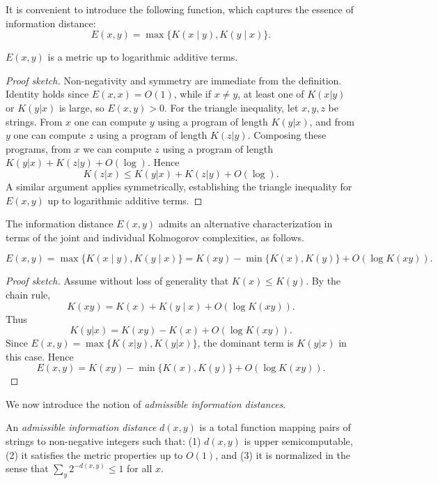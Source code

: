 It is convenient to introduce the following function, which captures the essence of information distance:
\[
E(x, y) = \max\{ K(x \mid y), K(y \mid x) \}.
\]
\begin{proposition}
$E(x,y)$ is a metric up to logarithmic additive terms.
\end{proposition}
\begin{proof}[Proof sketch]
Non-negativity and symmetry are immediate from the definition. 
Identity holds since $E(x,x) = O(1)$, while if $x \neq y$, at least one of $K(x|y)$ or $K(y|x)$ is large, so $E(x,y) > 0$. 
For the triangle inequality, let $x,y,z$ be strings. 
From $x$ one can compute $y$ using a program of length $K(y|x)$, and from $y$ one can compute $z$ using a program of length $K(z|y)$. 
Composing these programs, from $x$ we can compute $z$ using a program of length $K(y|x)+K(z|y)+O(\log)$. 
Hence
\[
K(z|x) \leq K(y|x) + K(z|y) + O(\log).
\]
A similar argument applies symmetrically, establishing the triangle inequality for $E(x,y)$ up to logarithmic additive terms.
\end{proof}

The information distance $E(x,y)$ admits an alternative characterization in terms of the joint and individual Kolmogorov complexities, as follows.

\begin{proposition}
\[
E(x, y) = \max\{ K(x \mid y), K(y \mid x) \} = K(xy) - \min\{ K(x), K(y) \} + O(\log K(xy)).
\]
\end{proposition}
\begin{proof}[Proof sketch]
Assume without loss of generality that $K(x) \leq K(y)$. 
By the chain rule,
\[
K(xy) = K(x) + K(y \mid x) + O(\log K(xy)).
\]
Thus
\[
K(y|x) = K(xy) - K(x) + O(\log K(xy)).
\]
Since $E(x,y) = \max\{K(x|y),K(y|x)\}$, the dominant term is $K(y|x)$ in this case. 
Hence
\[
E(x,y) = K(xy) - \min\{K(x),K(y)\} + O(\log K(xy)).
\]
\end{proof}

We now introduce the notion of \emph{admissible information distances}.

\begin{definition}
An \emph{admissible information distance} $d(x,y)$ is a total function mapping pairs of strings to non-negative integers such that:  
(1) $d(x,y)$ is upper semicomputable,  
(2) it satisfies the metric properties up to $O(1)$, and  
(3) it is normalized in the sense that $\sum_{y} 2^{-d(x,y)} \leq 1$ for all $x$.
\end{definition}

